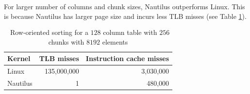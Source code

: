 For larger number of columns and chunk sizes, Nautilus outperforms Linux. This is because Nautilus has larger page size and incurs less TLB misses (see Table \ref{table:cache_miss}).

\begin{table}
  \bgroup
  \def\arraystretch{1.3}%
  \setlength\tabcolsep{1cm}
  \begin{tabular}{l || r | r }
    \textbf{Kernel}    & TLB misses  & Instruction cache misses \\
    \hline\hline
    {Linux}            & 135,000,000 & 3,030,000 \\
    {Nautilus}         &           1 &   480,000 \\
  \end{tabular}
  \egroup
  \label{table:cache_miss}
  \caption{~Row-oriented sorting for a $128$ column table with $256$ chunks with $8192$ elements}
\end{table}

